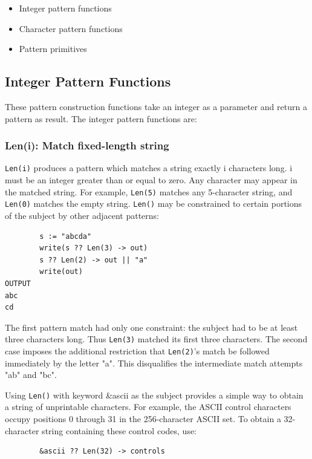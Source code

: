 \documentclass[letterpaper,12pt]{article}
\begin{document}
\begin{itemize}
\item Integer pattern functions
\item Character pattern functions
\item Pattern primitives
\end{itemize}

\subsection{Integer Pattern Functions}

These pattern construction functions take an integer as a parameter
and return a pattern as result. The integer pattern functions are:

\subsubsection{Len(i): Match fixed-length string}

{\tt Len(i)} produces a pattern which matches a string exactly i characters
long. i must be an integer greater than or equal to zero. Any
character may appear in the matched string. For example, {\tt Len(5)}
matches any 5-character string, and {\tt Len(0)} matches the empty
string. {\tt Len()} may be constrained to certain portions of the subject
by other adjacent patterns:

\begin{verbatim}
        s := "abcda"
        write(s ?? Len(3) -> out)
        s ?? Len(2) -> out || "a"
        write(out)
OUTPUT
abc
cd
\end{verbatim}

The first pattern match had only one constraint: the subject had
to be at least three characters long. Thus {\tt Len(3)} matched its first
three characters. The second case imposes the additional restriction
that {\tt Len(2)}'s match be followed immediately by the letter "a". This
disqualifies the intermediate match attempts "ab" and "bc".

Using {\tt Len()} with keyword \&ascii as the subject provides a simple way
to obtain a string of unprintable characters. For example, the ASCII
control characters occupy positions 0 through 31 in the 256-character
ASCII set. To obtain a 32-character string containing these control
codes, use:

\begin{verbatim}
        &ascii ?? Len(32) -> controls
\end{verbatim}
\end{document}
